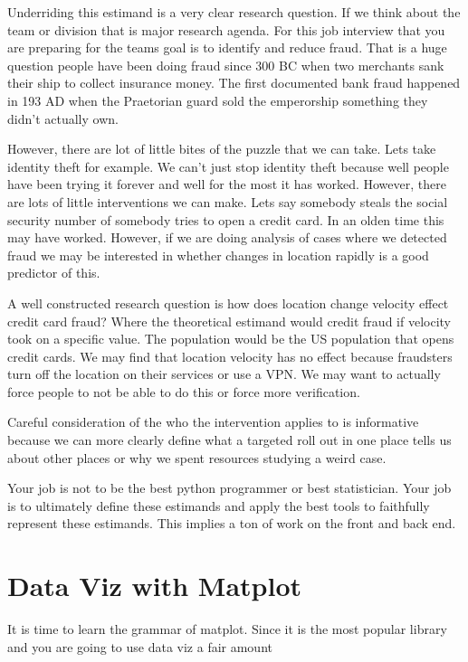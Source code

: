 \documentclass[
  letterpaper,
  DIV=11,
  numbers=noendperiod]{scrreprt}
\begin{document}
Underriding this estimand is a very clear research question. If we think
about the team or division that is major research agenda. For this job
interview that you are preparing for the teams goal is to identify and
reduce fraud. That is a huge question people have been doing fraud since
300 BC when two merchants sank their ship to collect insurance money.
The first documented bank fraud happened in 193 AD when the Praetorian
guard sold the emperorship something they didn't actually own.

However, there are lot of little bites of the puzzle that we can take.
Lets take identity theft for example. We can't just stop identity theft
because well people have been trying it forever and well for the most it
has worked. However, there are lots of little interventions we can make.
Lets say somebody steals the social security number of somebody tries to
open a credit card. In an olden time this may have worked. However, if
we are doing analysis of cases where we detected fraud we may be
interested in whether changes in location rapidly is a good predictor of
this.

A well constructed research question is how does location change
velocity effect credit card fraud? Where the theoretical estimand would
credit fraud if velocity took on a specific value. The population would
be the US population that opens credit cards. We may find that location
velocity has no effect because fraudsters turn off the location on their
services or use a VPN. We may want to actually force people to not be
able to do this or force more verification.

Careful consideration of the who the intervention applies to is
informative because we can more clearly define what a targeted roll out
in one place tells us about other places or why we spent resources
studying a weird case.

Your job is not to be the best python programmer or best statistician.
Your job is to ultimately define these estimands and apply the best
tools to faithfully represent these estimands. This implies a ton of
work on the front and back end.


\chapter{Data Viz with Matplot}\label{data-viz-with-matplot}

It is time to learn the grammar of matplot. Since it is the most popular
library and you are going to use data viz a fair amount
\end{document}
